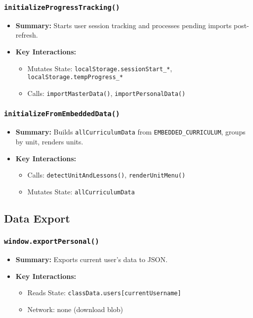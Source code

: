 \documentclass[11pt,letterpaper]{article}
\begin{document}
\subsubsection{\texttt{initializeProgressTracking()}}
\begin{itemize}
    \item \textbf{Summary:} Starts user session tracking and processes pending imports post-refresh.
    \item \textbf{Key Interactions:}
    \begin{itemize}
        \item Mutates State: \texttt{localStorage.sessionStart\_*}, \texttt{localStorage.tempProgress\_*}
        \item Calls: \texttt{importMasterData()}, \texttt{importPersonalData()}
    \end{itemize}
\end{itemize}

\subsubsection{\texttt{initializeFromEmbeddedData()}}
\begin{itemize}
    \item \textbf{Summary:} Builds \texttt{allCurriculumData} from \texttt{EMBEDDED\_CURRICULUM}, groups by unit, renders units.
    \item \textbf{Key Interactions:}
    \begin{itemize}
        \item Calls: \texttt{detectUnitAndLessons()}, \texttt{renderUnitMenu()}
        \item Mutates State: \texttt{allCurriculumData}
    \end{itemize}
\end{itemize}

\subsection{Data Export}

\subsubsection{\texttt{window.exportPersonal()}}
\begin{itemize}
    \item \textbf{Summary:} Exports current user's data to JSON.
    \item \textbf{Key Interactions:}
    \begin{itemize}
        \item Reads State: \texttt{classData.users[currentUsername]}
        \item Network: none (download blob)
    \end{itemize}
\end{itemize}
\end{document}
